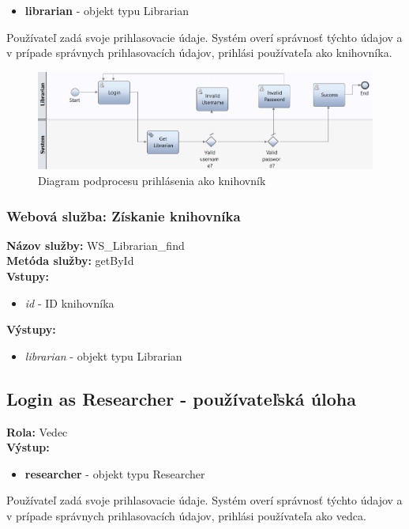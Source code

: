 \documentclass[10pt,oneside,slovak,a4paper]{article}
\begin{document}
\begin{itemize}
\item \textbf{librarian} - objekt typu Librarian
\end{itemize}

Používateľ zadá svoje prihlasovacie údaje. Systém overí správnosť týchto údajov a v prípade správnych prihlasovacích údajov, prihlási používateľa ako knihovníka.

\begin{figure} [H]
\centering
\includegraphics[scale=0.4]{diagrams/diagLoginLibrarian.jpg} 
\caption{Diagram podprocesu prihlásenia ako knihovník}
\end{figure}

\subsubsection{Webová služba: Získanie knihovníka}
\textbf{Názov služby:} WS\_Librarian\_find\\
\textbf{Metóda služby:} getById\\
\textbf{Vstupy:}
	\begin{itemize}
		\item \textit{id} - ID knihovníka
	\end{itemize}
\textbf{Výstupy:}
	\begin{itemize}
		\item \textit{librarian} - objekt typu Librarian
	\end{itemize}
	
\subsection{Login as Researcher - používateľská úloha}
\textbf{Rola:} Vedec\\
\textbf{Výstup:}

\begin{itemize}
\item \textbf{researcher} - objekt typu Researcher
\end{itemize}

Používateľ zadá svoje prihlasovacie údaje. Systém overí správnosť týchto údajov a v prípade správnych prihlasovacích údajov, prihlási používateľa ako vedca.
\end{document}
